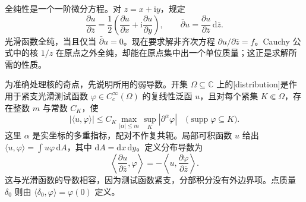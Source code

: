 全纯性是一个一阶微分方程。对 \(z=x+\mathrm{i} y\)，规定
\[
 \frac{\partial u}{\partial\overline z}
 =\frac12\left(\frac{\partial u}{\partial x}
       +\mathrm{i}\frac{\partial u}{\partial y}\right),\qquad
 \bar\partial u=\frac{\partial u}{\partial\overline z}\,\mathrm{d}\overline z.
\]
光滑函数全纯，当且仅当 \(\bar\partial u=0\)。现在要求解非齐次方程 \(\partial u/\partial\overline z=f\)。Cauchy 公式中的核 \(1/z\) 在原点之外全纯，却能在原点集中出一个单位质量；这正是求解所需的性质。

\ProseParagraphBreak

为准确处理核的奇点，先说明所用的弱导数。开集 \(\Omega\subseteq\mathbb C\) 上的[distribution]是作用于紧支光滑测试函数 \(\varphi\in C_c^\infty(\Omega)\) 的复线性泛函 \(u\)，且对每个紧集 \(K\Subset\Omega\)，存在整数 \(m\) 与常数 \(C_K\)，使
\[
 |\langle u,\varphi\rangle|
 \leq C_K\max_{|\alpha|\leq m}\sup_K|\partial^\alpha\varphi|
 \quad\bigl(\operatorname{supp}\varphi\subseteq K\bigr).
\]
这里 \(\alpha\) 是实坐标的多重指标，配对不作复共轭。局部可积函数 \(u\) 给出 \(\langle u,\varphi\rangle=\int u\varphi\,\mathrm{d}A\)，其中 \(\mathrm{d}A=\mathrm{d}x\,\mathrm{d}y\)。定义分布导数为
\[
 \left\langle\frac{\partial u}{\partial\overline z},\varphi\right\rangle
 =-\left\langle u,\frac{\partial\varphi}{\partial\overline z}\right\rangle.
\]
这与光滑函数的导数相容，因为测试函数紧支，分部积分没有外边界项。点质量 \(\delta_0\) 则由 \(\langle\delta_0,\varphi\rangle=\varphi(0)\) 定义。

